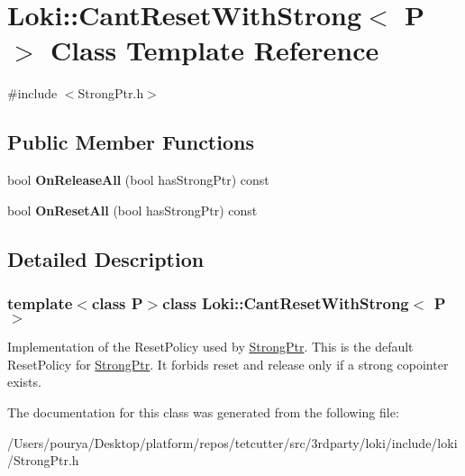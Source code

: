 \hypertarget{structLoki_1_1CantResetWithStrong}{}\section{Loki\+:\+:Cant\+Reset\+With\+Strong$<$ P $>$ Class Template Reference}
\label{structLoki_1_1CantResetWithStrong}


{\ttfamily \#include $<$Strong\+Ptr.\+h$>$}

\subsection*{Public Member Functions}
\begin{DoxyCompactItemize}
\item 
\hypertarget{structLoki_1_1CantResetWithStrong_aff7869316f4b57242449618084c3bfb9}{}bool {\bfseries On\+Release\+All} (bool has\+Strong\+Ptr) const \label{structLoki_1_1CantResetWithStrong_aff7869316f4b57242449618084c3bfb9}

\item 
\hypertarget{structLoki_1_1CantResetWithStrong_aa64ec9fc4ceea8a34c4895d36f7130d3}{}bool {\bfseries On\+Reset\+All} (bool has\+Strong\+Ptr) const \label{structLoki_1_1CantResetWithStrong_aa64ec9fc4ceea8a34c4895d36f7130d3}

\end{DoxyCompactItemize}


\subsection{Detailed Description}
\subsubsection*{template$<$class P$>$class Loki\+::\+Cant\+Reset\+With\+Strong$<$ P $>$}

Implementation of the Reset\+Policy used by \hyperlink{classLoki_1_1StrongPtr}{Strong\+Ptr}. This is the default Reset\+Policy for \hyperlink{classLoki_1_1StrongPtr}{Strong\+Ptr}. It forbids reset and release only if a strong copointer exists. 

The documentation for this class was generated from the following file\+:\begin{DoxyCompactItemize}
\item 
/\+Users/pourya/\+Desktop/platform/repos/tetcutter/src/3rdparty/loki/include/loki/Strong\+Ptr.\+h\end{DoxyCompactItemize}
